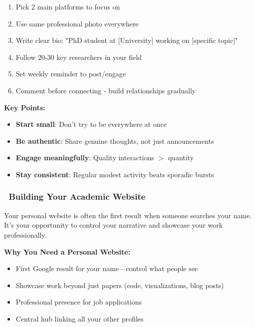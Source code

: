\documentclass[11pt,a4paper]{article}
\begin{document}
\begin{tcolorbox}[colback=purple!5,colframe=purple!40,title={\faCheckCircle~Quick Start Checklist}]
\begin{enumerate}
    \item Pick 2 main platforms to focus on
    \item Use same professional photo everywhere
    \item Write clear bio: "PhD student at [University] working on [specific topic]"
    \item Follow 20-30 key researchers in your field
    \item Set weekly reminder to post/engage
    \item Comment before connecting - build relationships gradually
\end{enumerate}

\textbf{Key Points:}
\begin{itemize}[leftmargin=1.5em]
    \item \textbf{Start small}: Don't try to be everywhere at once
    \item \textbf{Be authentic}: Share genuine thoughts, not just announcements
    \item \textbf{Engage meaningfully}: Quality interactions $>$ quantity
    \item \textbf{Stay consistent}: Regular modest activity beats sporadic bursts
\end{itemize}
\end{tcolorbox}

\subsubsection{\faGlobe~Building Your Academic Website}

\begin{tcolorbox}[colback=green!5,colframe=green!50,title=Your Digital Academic Identity]
Your personal website is often the first result when someone searches your name. It's your opportunity to control your narrative and showcase your work professionally.
\end{tcolorbox}

\textbf{Why You Need a Personal Website:}
\begin{itemize}
    \item First Google result for your name—control what people see
    \item Showcase work beyond just papers (code, visualizations, blog posts)
    \item Professional presence for job applications
    \item Central hub linking all your other profiles
\end{itemize}
\end{document}
